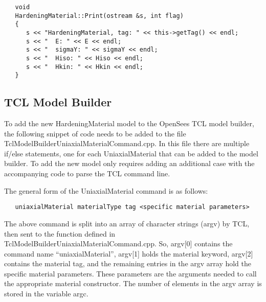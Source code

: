 \documentclass[12pt]{article}
\begin{document}
{\sf\small
\begin{verbatim}
   void 
   HardeningMaterial::Print(ostream &s, int flag)
   {
      s << "HardeningMaterial, tag: " << this->getTag() << endl;
      s << "  E: " << E << endl;
      s << "  sigmaY: " << sigmaY << endl;
      s << "  Hiso: " << Hiso << endl;
      s << "  Hkin: " << Hkin << endl;
   }
\end{verbatim}
}

\subsection{TCL Model Builder}
To add the new HardeningMaterial model to the OpenSees TCL model builder, the following snippet
of code needs to be added to the file TclModelBuilderUniaxialMaterialCommand.cpp. In this file
there are multiple if/else statements, one for each UniaxialMaterial that can be added to the model builder.
To add the new model only requires adding an additional case with the accompanying code to parse
the TCL command line.

The general form of the UniaxialMaterial command is as follows:

{\sf\small
\begin{verbatim}
   uniaxialMaterial materialType tag <specific material parameters>
\end{verbatim}
}

\noindent The above command is split into an array of character strings (argv) by TCL, then
sent to the function defined in TclModelBuilderUniaxialMaterialCommand.cpp. So, argv[0]
contains the command name ``uniaxialMaterial'', argv[1] holds the material keyword, argv[2]
contains the material tag, and the remaining entries in the argv array hold the specific
material parameters. These parameters are the arguments needed to call the appropriate
material constructor. The number of elements in the argv array is stored in the variable argc.
\end{document}
